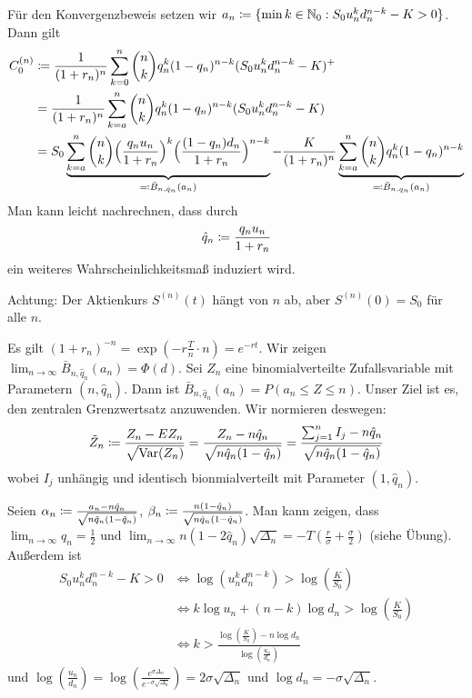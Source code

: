 \documentclass[a4paper,twoside,DIV15,BCOR12mm]{scrbook}
\DeclareMathOperator{\Var}{Var}
\begin{document}
\begin{beweis}
Für den Konvergenzbeweis setzen wir $a_n \da \{\min k \in\MdN_0: S_0 u_n^k d_n^{n-k} - K > 0\}$. Dann gilt
\begin{align*}
C_0^{(n)} &\da \frac 1{(1+r_n)^n} \sum_{k=0}^n \binom n k q_n^k(1-q_n)^{n-k} (S_0 u_n^k d_n^{n-k} - K)^+ \\
&= \frac 1{(1+r_n)^n} \sum_{k=a}^n \binom n k q_n^k(1-q_n)^{n-k} (S_0 u_n^k d_n^{n-k} - K) \\
&= S_0 \underbrace{\sum_{k=a}^n \binom n k \Big(\frac{q_nu_n}{1+r_n}\Big)^k \Big(\frac{(1-q_n)d_n}{1+r_n}\Big)^{n-k}}_{\ad \bar B_{n,\hat q_n}(a_n)} - \frac K{(1+r_n)^n} \underbrace{\sum_{k=a}^n \binom n k q_n^k (1-q_n)^{n-k}}_{\ad \bar B_{n,q_n}(a_n)}
\end{align*}
Man kann leicht nachrechnen, dass durch
\[
\hat q_n \da \frac{q_nu_n}{1+r_n}
\]
ein weiteres Wahrscheinlichkeitsmaß induziert wird.

Achtung: Der Aktienkurs $S^{(n)}(t)$ hängt von $n$ ab, aber $S^{(n)}(0)=S_0$ für alle $n$.

Es gilt $(1+r_n)^{-n} = \exp(-r \frac T n \cdot n) = e^{-rt}$. Wir zeigen $\lim_{n\to\infty} \bar B_{n,\hat q_n} (a_n) = \Phi(d)$. Sei $Z_n$ eine binomialverteilte Zufallsvariable mit Parametern $(n,\hat q_n)$. Dann ist 
$\bar B_{n,\hat q_n} (a_n) = P(a_n \le Z \le n)$. Unser Ziel ist es, den zentralen Grenzwertsatz anzuwenden. Wir normieren deswegen: 
\[
\tilde Z_n \da \frac{Z_n - EZ_n}{\sqrt{\Var(Z_n)}} = \frac{Z_n - n\hat q_n}{\sqrt{n \hat q_n (1-\hat q_n)}} = \frac{\sum_{j=1}^n I_j - n\hat q_n}{\sqrt{n \hat q_n (1-\hat q_n)}}
\]
wobei $I_j$ unhängig und identisch bionmialverteilt mit Parameter $(1,\hat q_n)$.

Seien $\alpha_n \da \frac{a_n - n\hat q_n}{\sqrt{n \hat q_n (1-\hat q_n)}}$, $\beta_n \da \frac{n(1-\hat q_n)}{\sqrt{n \hat q_n (1-\hat q_n)}}$. Man kann zeigen, dass $\lim_{n\to\infty} q_n = \frac 12$ und $\lim_{n\to \infty} n(1-2\hat q_n)\sqrt{\Delta_n} = -T (\frac r\sigma + \frac \sigma 2)$ (siehe Übung). Außerdem ist 
\begin{align*}
S_0 u_n^k d_n^{n-k} - K > 0 &\iff \log(u_n^k d_n^{n-k}) > \log (\frac K {S_0}) \\
&\iff k \log u_n + (n-k)\log d_n > \log (\frac K {S_0})\\
&\iff k > \frac{\log(\frac K {S_0}) - n \log d_n}{\log(\frac{u_n}{d_n})} 
\end{align*}
und $\log (\frac{u_n}{d_n}) = \log(\frac{e^{\sigma{\Delta_n}}}{e^{-\sigma\sqrt{\Delta_n}}}) = 2 \sigma \sqrt{\Delta_n}$ und $\log d_n = - \sigma \sqrt{\Delta_n}$.


\end{beweis}
\end{document}
